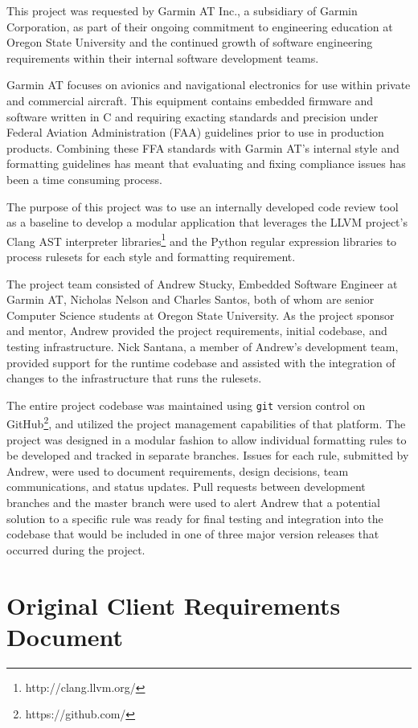 \documentclass[11pt]{scrreprt}
\begin{document}
This project was requested by Garmin AT Inc., a subsidiary of Garmin Corporation, as part of their ongoing commitment to engineering education at Oregon State University and the continued growth of software engineering requirements within their internal software development teams.

Garmin AT focuses on avionics and navigational electronics for use within private and commercial aircraft.
This equipment contains embedded firmware and software written in C and requiring exacting standards and precision under Federal Aviation Administration (FAA) guidelines prior 
to use in production products.
Combining these FFA standards with Garmin AT's internal style and formatting guidelines has meant that evaluating and fixing compliance issues has been a time consuming process.

The purpose of this project was to use an internally developed code review tool as a baseline to develop a modular application that leverages the LLVM project's Clang AST interpreter libraries\footnote{http://clang.llvm.org/} and the Python regular expression libraries to process rulesets for each style and formatting requirement.

The project team consisted of Andrew Stucky, Embedded Software Engineer at Garmin AT, Nicholas Nelson and Charles Santos, both of whom are senior Computer Science students at Oregon State University.
As the project sponsor and mentor, Andrew provided the project requirements, initial codebase, and testing infrastructure.
Nick Santana, a member of Andrew's development team, provided support for the runtime codebase and assisted with the integration of changes to the infrastructure that runs the rulesets.

The entire project codebase was maintained using \texttt{git} version control on GitHub\footnote{https://github.com/}, and utilized the project management capabilities of that platform.
The project was designed in a modular fashion to allow individual formatting rules to be developed and tracked in separate branches.
Issues for each rule, submitted by Andrew, were used to document requirements, design decisions, team communications, and status updates.
Pull requests between development branches and the master branch were used to alert Andrew that a potential solution to a specific rule was ready for final testing and integration into the codebase that would be included in one of three major version releases that occurred during the project.

\chapter{Original Client Requirements Document} \label{orig_req_doc}
\end{document}
